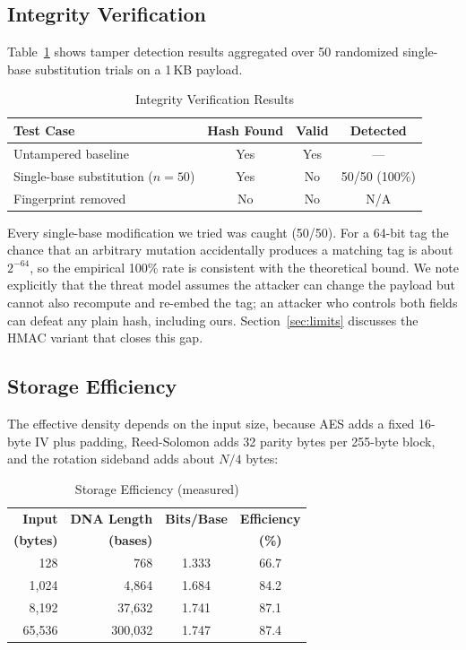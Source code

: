 \documentclass[conference]{IEEEtran}
\begin{document}
\subsection{Integrity Verification}

Table~\ref{tab:integrity} shows tamper detection results aggregated over 50 randomized single-base substitution trials on a 1\,KB payload.

\begin{table}[htbp]
\caption{Integrity Verification Results}
\begin{center}
\begin{tabular}{|l|c|c|c|}
\hline
\textbf{Test Case} & \textbf{Hash Found} & \textbf{Valid} & \textbf{Detected} \\
\hline
Untampered baseline & Yes & Yes & --- \\
\hline
Single-base substitution ($n=50$) & Yes & No & 50/50 (100\%) \\
\hline
Fingerprint removed & No & No & N/A \\
\hline
\end{tabular}
\label{tab:integrity}
\end{center}
\end{table}

Every single-base modification we tried was caught (50/50). For a 64-bit tag the chance that an arbitrary mutation accidentally produces a matching tag is about $2^{-64}$, so the empirical 100\% rate is consistent with the theoretical bound. We note explicitly that the threat model assumes the attacker can change the payload but cannot also recompute and re-embed the tag; an attacker who controls both fields can defeat any plain hash, including ours. Section~\ref{sec:limits} discusses the HMAC variant that closes this gap.

\subsection{Storage Efficiency}

The effective density depends on the input size, because AES adds a fixed 16-byte IV plus padding, Reed-Solomon adds 32 parity bytes per 255-byte block, and the rotation sideband adds about $N/4$ bytes:

\begin{table}[htbp]
\caption{Storage Efficiency (measured)}
\begin{center}
\begin{tabular}{|r|r|c|c|}
\hline
\textbf{Input} & \textbf{DNA Length} & \textbf{Bits/Base} & \textbf{Efficiency} \\
\textbf{(bytes)} & \textbf{(bases)} & & \textbf{(\%)} \\
\hline
128       & 768       & 1.333 & 66.7 \\
\hline
1{,}024     & 4{,}864     & 1.684 & 84.2 \\
\hline
8{,}192     & 37{,}632    & 1.741 & 87.1 \\
\hline
65{,}536    & 300{,}032   & 1.747 & 87.4 \\
\hline
\end{tabular}
\label{tab:density}
\end{center}
\end{table}
\end{document}
